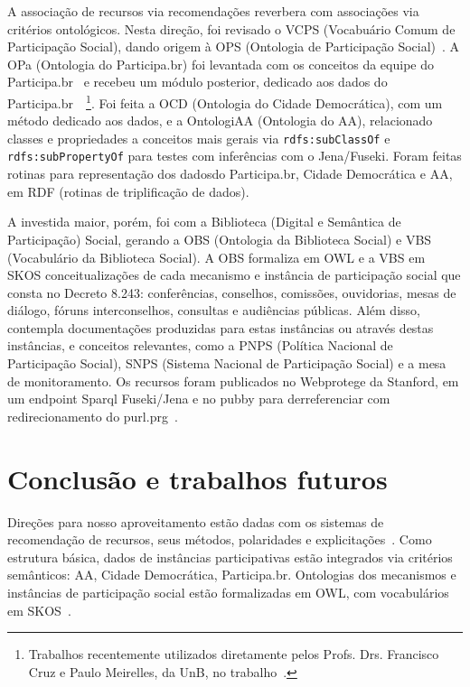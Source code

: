 \documentclass[a4paper, 11pt]{article} %
\begin{document}
A associação de recursos via recomendações reverbera com associações via critérios ontológicos. Nesta direção, foi revisado o VCPS (Vocabuário Comum de Participação Social), dando origem à OPS (Ontologia de Participação Social)~\cite{artOPS}. A OPa (Ontologia do Participa.br) foi levantada com os conceitos da equipe do Participa.br~\cite{pnud1} e recebeu um módulo posterior, dedicado aos dados do Participa.br~\cite{pnud5}~\footnote{Trabalhos recentemente utilizados diretamente pelos Profs. Drs. Francisco Cruz e Paulo Meirelles, da UnB, no trabalho~\cite{paulo6}.}. Foi feita a OCD (Ontologia do Cidade Democrática), com um método dedicado aos dados, e a OntologiAA (Ontologia do AA), relacionado classes e propriedades a conceitos mais gerais via \texttt{rdfs:subClassOf} e \texttt{rdfs:subPropertyOf} para testes com inferências com o Jena/Fuseki. Foram feitas rotinas para representação dos dadosdo Participa.br, Cidade Democrática e AA, em RDF (rotinas de triplificação de dados).

A investida maior, porém, foi com a Biblioteca (Digital e Semântica de Participação) Social, gerando a OBS (Ontologia da Biblioteca Social) e VBS (Vocabulário da Biblioteca Social). A OBS formaliza em OWL e a VBS em SKOS conceitualizações de cada mecanismo e instância de participação social que consta no Decreto 8.243: conferências, conselhos, comissões, ouvidorias, mesas de diálogo, fóruns interconselhos, consultas e audiências públicas. Além disso, contempla documentações produzidas para estas instâncias ou através destas instâncias, e conceitos relevantes, como a PNPS (Política Nacional de Participação Social), SNPS (Sistema Nacional de Participação Social) e a mesa de monitoramento. Os recursos foram publicados no Webprotege da Stanford, em um endpoint Sparql Fuseki/Jena e no pubby para derreferenciar com redirecionamento do purl.prg~\cite{pnud5}.




\section*{Conclusão e trabalhos futuros}

Direções para nosso aproveitamento estão dadas com os sistemas de recomendação de recursos, seus métodos, polaridades e explicitações~\cite{pnud4}. Como estrutura básica, dados de instâncias participativas estão integrados via critérios semânticos: AA, Cidade Democrática, Participa.br. Ontologias dos mecanismos e instâncias de participação social estão formalizadas em OWL, com vocabulários em SKOS~\cite{pnud5}.
\end{document}
